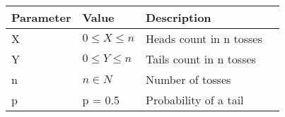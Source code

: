\begin{tabular}{|l|l|l|l|}\hline
Parameter        &Value                    &Description\\\hline
X	 &$ 0 \le X \le n$	 &Heads count in n tosses\\\hline
Y       &$ 0\le Y \le n$  &Tails count in n tosses\\\hline
n       &$n \in N$        &Number of tosses\\\hline
p	&p = 0.5	&Probability of a tail\\\hline
\end{tabular}
